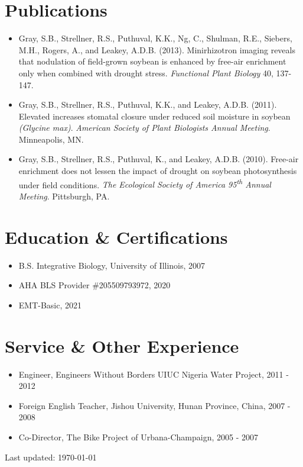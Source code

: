 \documentclass[letterpaper]{article}
\def\footerlink{}
\begin{document}
\section*{Publications}

  \begin{itemize}

    \item Gray, S.B., Strellner, R.S., Puthuval, K.K., Ng, C., Shulman, R.E., Siebers, M.H., Rogers, A., and Leakey, A.D.B. (2013). Minirhizotron imaging reveals that nodulation of field-grown soybean is enhanced by free-air  enrichment only when combined with drought stress. {\it Functional Plant Biology} 40, 137-147.
    \item Gray, S.B., Strellner, R.S., Puthuval, K.K., and Leakey, A.D.B. (2011). Elevated  increases stomatal closure under reduced soil moisture in soybean {\it(Glycine max)}. {\it American Society of Plant Biologists Annual Meeting}. Minneapolis, MN.
    \item Gray, S.B., Strellner, R.S., Puthuval, K., and Leakey, A.D.B. (2010). Free-air  enrichment does not lessen the impact of drought on soybean photosynthesis under field conditions. {\it The Ecological Society of America 95\textsuperscript{th} Annual Meeting}. Pittsburgh, PA.

  \end{itemize}

\section*{Education \& Certifications}

  \begin{itemize}
    \item B.S. Integrative Biology, University of Illinois, 2007
    \item AHA BLS Provider \#205509793972, 2020
    \item EMT-Basic, 2021
  \end{itemize}

\section*{Service \& Other Experience}

  \begin{itemize}
      \item Engineer, Engineers Without Borders UIUC Nigeria Water Project, 2011 - 2012
      \item Foreign English Teacher, Jishou University, Hunan Province, China, 2007 - 2008
      \item Co-Director, The Bike Project of Urbana-Champaign, 2005 - 2007
  \end{itemize}

\bigskip

\begin{center}
  \begin{footnotesize}
    Last updated: \today \\
    \href{\footerlink}{\texttt{\footerlink}}
  \end{footnotesize}
\end{center}
\end{document}
